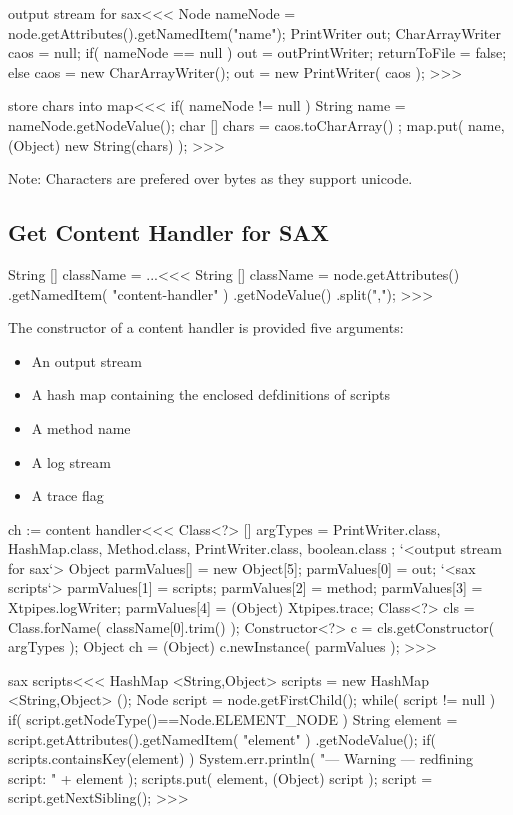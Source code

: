 \documentclass{article}
\begin{document}
{\<output stream for sax\><<<
Node nameNode = node.getAttributes().getNamedItem("name");
PrintWriter out;
CharArrayWriter caos = null;
if( nameNode == null ){
   out = outPrintWriter;
   returnToFile = false;
} else {
   caos = new CharArrayWriter();
   out = new PrintWriter( caos );
}
>>>

\<store chars into map\><<<
if( nameNode != null ){
   String name = nameNode.getNodeValue();
   char [] chars = caos.toCharArray() ;
   map.put( name, (Object) new String(chars) );
}
>>>

Note: Characters are prefered over bytes as they support
unicode.

\subsection{Get Content Handler for SAX}

\<String [] className = ...\><<<
String [] className = node.getAttributes()
                     .getNamedItem( "content-handler" )
                     .getNodeValue()
                     .split(",");
>>>




The constructor of a content handler is provided five arguments:

\begin{itemize}
\item
An output stream
\item
A hash map containing the enclosed defdinitions of scripts
\item A method name
\item A log stream
\item A trace flag
\end{itemize}


\<ch := content handler\><<<
Class<?> [] argTypes = {
         PrintWriter.class, HashMap.class, Method.class,
         PrintWriter.class, boolean.class };
`<output stream for sax`>
Object parmValues[] = new Object[5];
parmValues[0] = out;
`<sax scripts`>  parmValues[1] = scripts;
parmValues[2] = method;
parmValues[3] = Xtpipes.logWriter;
parmValues[4] = (Object) Xtpipes.trace;
Class<?> cls = Class.forName( className[0].trim() );
Constructor<?> c = cls.getConstructor( argTypes );
Object ch = (Object) c.newInstance( parmValues );
>>>

\<sax scripts\><<<
HashMap <String,Object> scripts = new HashMap <String,Object> ();
Node script = node.getFirstChild();
while( script != null ){
  if( script.getNodeType()==Node.ELEMENT_NODE ){
     String element = script.getAttributes().getNamedItem( "element" )
                                       .getNodeValue();
     if( scripts.containsKey(element) ){
        System.err.println(
           "--- Warning --- redfining script: " + element );
     }
     scripts.put( element, (Object) script );
  }
  script = script.getNextSibling();
}
>>>

}
\end{document}
